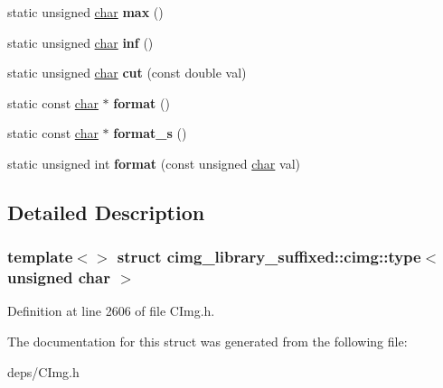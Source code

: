 \begin{DoxyCompactItemize}
\item 
\mbox{\label{structcimg__library__suffixed_1_1cimg_1_1type_3_01unsigned_01char_01_4_a6c9fff1f80d8e26af860272907cdfff9}} 
static unsigned \hyperlink{classchar}{char} {\bfseries max} ()
\item 
\mbox{\label{structcimg__library__suffixed_1_1cimg_1_1type_3_01unsigned_01char_01_4_a17615035b6a1bf38e7b91e237f56dc6e}} 
static unsigned \hyperlink{classchar}{char} {\bfseries inf} ()
\item 
\mbox{\label{structcimg__library__suffixed_1_1cimg_1_1type_3_01unsigned_01char_01_4_a97098b778e0e303ac953ec0a1e549824}} 
static unsigned \hyperlink{classchar}{char} {\bfseries cut} (const double val)
\item 
\mbox{\label{structcimg__library__suffixed_1_1cimg_1_1type_3_01unsigned_01char_01_4_addedf8fb4e90b3ed3b8ffc5b786cc5b2}} 
static const \hyperlink{classchar}{char} $\ast$ {\bfseries format} ()
\item 
\mbox{\label{structcimg__library__suffixed_1_1cimg_1_1type_3_01unsigned_01char_01_4_af188896026875c1c5a1757098bd7faa6}} 
static const \hyperlink{classchar}{char} $\ast$ {\bfseries format\+\_\+s} ()
\item 
\mbox{\label{structcimg__library__suffixed_1_1cimg_1_1type_3_01unsigned_01char_01_4_a14b7cdb40243204a69d1d06ddf8a6fca}} 
static unsigned int {\bfseries format} (const unsigned \hyperlink{classchar}{char} val)
\end{DoxyCompactItemize}


\subsection{Detailed Description}
\subsubsection*{template$<$$>$\newline
struct cimg\+\_\+library\+\_\+suffixed\+::cimg\+::type$<$ unsigned char $>$}



Definition at line 2606 of file C\+Img.\+h.



The documentation for this struct was generated from the following file\+:\begin{DoxyCompactItemize}
\item 
deps/C\+Img.\+h\end{DoxyCompactItemize}
